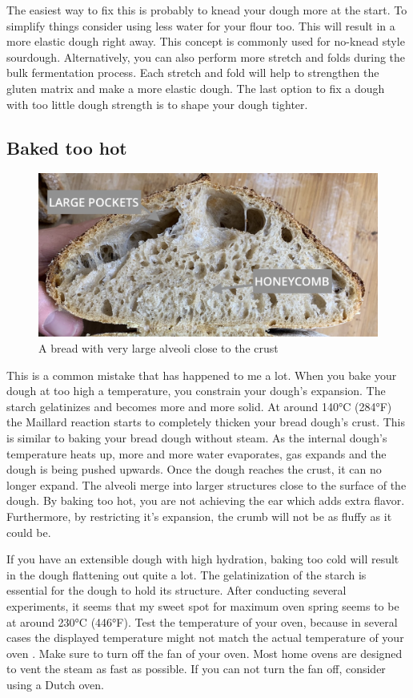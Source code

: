 The easiest way to fix this is probably to knead your dough more at the start. To simplify
things consider using less water for your flour too. This will result in a more elastic dough
right away. This concept is commonly used for no-knead style sourdough.  Alternatively, you
can also perform more stretch and folds during the bulk fermentation process. Each
stretch and fold will help to strengthen the gluten matrix and make a more elastic dough.
The last option to fix a dough with too little dough strength is to shape your dough tighter.

\subsection{Baked too hot}

\begin{figure}
  \includegraphics[width=\textwidth]{baked-too-hot-v2}
  \caption{A bread with very large alveoli close to the crust}
  \label{baked-too-hot}
\end{figure}

This is a common mistake that has happened to me a lot. When you bake your dough
at too high a temperature, you constrain your dough's expansion. The starch gelatinizes
and becomes more and more solid. At around 140°C (284°F) the Maillard reaction
starts to completely thicken your bread dough's crust. This is similar to baking
your bread dough without steam. As the internal dough's temperature heats up,
more and more water evaporates, gas expands and the dough is being pushed upwards.
Once the dough reaches the crust, it can no longer expand. The alveoli merge
into larger structures close to the surface of the dough. By baking too hot,
you are not achieving the ear which adds extra flavor. Furthermore, by restricting
it's expansion, the crumb will not be as fluffy as it could be.

If you have an extensible dough with high hydration, baking too cold will result
in the dough flattening out quite a lot. The gelatinization of the starch is
essential for the dough to hold its structure. After conducting several
experiments, it seems that my sweet spot for maximum oven spring seems to be
at around 230°C (446°F). Test the temperature of your oven, because in several
cases the displayed temperature might not match the actual temperature of your
oven \cite{too+hot+baking}. Make sure to turn off the fan of your oven. Most
home ovens are designed to vent the steam as fast as possible. If you can not
turn the fan off, consider using a Dutch oven.

